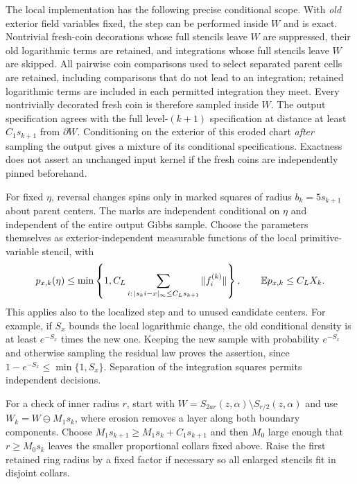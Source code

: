 The local implementation has the following precise conditional scope.
With \emph{old} exterior field variables fixed, the step can be performed
inside $W$ and is exact.  Nontrivial fresh-coin decorations whose full
stencils leave $W$ are suppressed, their old logarithmic terms are
retained, and integrations whose full stencils leave $W$ are skipped.
All pairwise coin comparisons used to select separated parent cells
are retained, including comparisons that do not lead to an integration;
retained logarithmic terms are included in each permitted integration
they meet.  Every
nontrivially decorated fresh coin is therefore sampled inside $W$.
The output specification agrees with the full level-$(k+1)$
specification at distance at least $C_1s_{k+1}$ from $\partial W$.
Conditioning on the exterior of this eroded chart \emph{after} sampling
the output gives a mixture of its conditional specifications.  Exactness
does not assert an unchanged input kernel if the fresh coins are
independently pinned beforehand.

For fixed $\eta$, reversal changes spins only in marked squares of
radius $b_k=5s_{k+1}$ about parent centers.  The marks are independent
conditional on $\eta$ and independent of the entire output Gibbs
sample.  Choose the parameters themselves as exterior-independent
measurable functions of the local primitive-variable stencil, with
\begin{equation}
 p_{x,k}(\eta)\leq\min\left\{1,
 C_L\sum_{i:\,|s_ki-x|_\infty\leq C_Ls_{k+1}}\|f_i^{(k)}\|\right\},
 \qquad \mathbb E p_{x,k}\leq C_LX_k.
 \label{eq:crossing-marks}
\end{equation}
This applies also to the localized step and to unused candidate centers.
For example, if $S_x$ bounds the local logarithmic change, the old
conditional density is at least $e^{-S_x}$ times the new one.  Keeping
the new sample with probability $e^{-S_x}$ and otherwise sampling the
residual law proves the assertion, since $1-e^{-S_x}\leq\min\{1,S_x\}$.
Separation of the integration squares permits independent decisions.

For a check of inner radius $r$, start with
$W=S_{2ar}(z,\alpha)\setminus S_{r/2}(z,\alpha)$ and use
$W_k=W\ominus M_1s_k$, where erosion removes a layer along both
boundary components.  Choose
$M_1s_{k+1}\geq M_1s_k+C_1s_{k+1}$ and then $M_0$ large enough that
$r\geq M_0s_k$ leaves the smaller proportional collars fixed above.
Raise the first retained ring radius by a fixed factor if necessary so
all enlarged stencils fit in disjoint collars.

